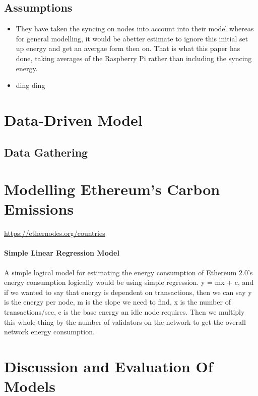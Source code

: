 \subsection{Assumptions}

\begin{itemize}
    \item They have taken the syncing on nodes into account into their model whereas for general modelling, it would be  abetter estimate to ignore this initial set up energy and get an avergae form then on. That is what this paper has done, taking averages of the Raspberry Pi rather than including the syncing energy.
    \item ding ding
\end{itemize}


\section{ Data-Driven Model}
\subsection{Data Gathering}






\section {Modelling Ethereum's Carbon Emissions}
\url{https://ethernodes.org/countries}

\paragraph{ Simple Linear Regression Model}
A simple logical model for estimating the energy consumption of Ethereum 2.0's energy consumption logically would be using simple regression. y = mx + c, and if we wanted to say that energy is dependent on transactions, then we can say y is the energy per node, m is the slope we need to find, x is the number of transactions/sec, c is the base energy an idle node requires. Then we multiply this whole thing by the number of validators on the network to get the overall network energy consumption.

\section{Discussion and Evaluation Of Models}
